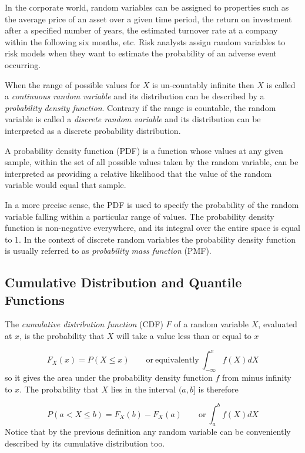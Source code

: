 In the corporate world, random variables can be assigned to properties such as the average price of an 
asset over a given time period, the return on investment after a specified number of years, the estimated 
turnover rate at a company within the following six months, etc. Risk analysts assign random variables 
to risk models when they want to estimate the probability of an adverse event occurring. 

When the range of possible values for \(X\) is un-countably infinite then \(X\) 
is called a \emph{continuous random variable} and its distribution can be described by a
\emph{probability density function}.
Contrary if the range is countable, the random
variable is called a \emph{discrete random variable} and its
distribution can be interpreted as a discrete probability distribution.

A probability density function (PDF) is a function whose values at any given sample,
within the set of all possible values taken by the random variable, 
can be interpreted as providing a relative likelihood that the value of the random variable
would equal that sample. 

In a more precise sense, the PDF is used to specify the probability of the random variable falling 
within a particular range of values.
The probability density function is non-negative everywhere, and its integral over the entire space 
is equal to 1.
In the context of discrete random variables the probability density function is usually referred 
to as \emph{probability mass function} (PMF).

\subsection{Cumulative Distribution and Quantile Functions}\label{sec:quantile-function}

The \emph{cumulative distribution function} (CDF) \(F\) of a random variable \(X\), 
evaluated at \(x\), is the probability that \(X\) will take a value less than or equal to \(x\)

\begin{equation}
	F_X(x) = P(X \le x)\qquad\mathrm{or~equivalently}~\int_{-\infty}^{x}{f(X)dX}
\end{equation}
so it gives the area under the probability density function \(f\) from
minus infinity to \(x\).
The probability that \(X\) lies in the interval \((a,b]\) is therefore

\begin{equation}
	P(a\lt X \le b)=F_{X}(b)-F_{X}(a)\qquad\mathrm{or}~\int_a^b{f(X)dX}
\end{equation}
Notice that by the previous definition any random variable can be conveniently described by its 
cumulative distribution too.

